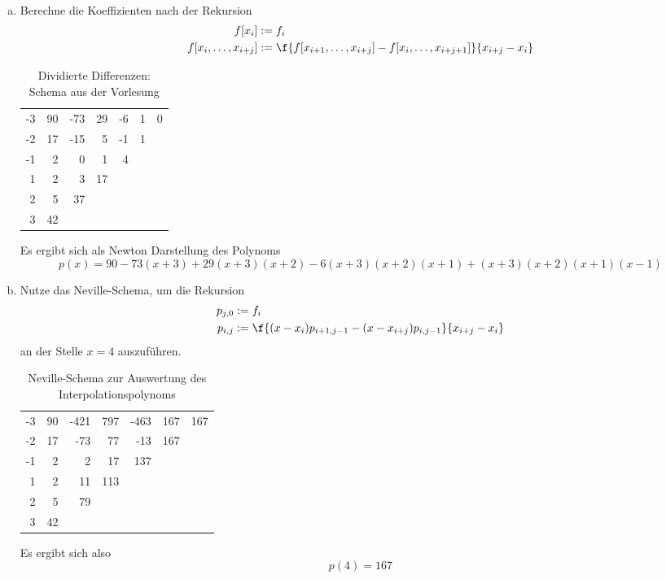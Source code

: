 \documentclass[a4paper]{scrartcl}
\begin{document}
\begin{aufgabe}~

	\begin{enumerate}[a)]
		\item 
			Berechne die Koeffizienten nach der Rekursion
			\begin{align*}
				f[x_i] &:= f_i\\
				f[x_i,\dotsc,x_{i+j}] &:= \f {f[x_{i+1},\dotsc,x_{i+j}]-f[x_i,\dotsc,x_{i+j+1}]}{x_{i+j}-x_i}
			\end{align*}

			\begin{table}[h]
				\centering
				\caption{Dividierte Differenzen: Schema aus der Vorlesung}
				\begin{tabular}{r|rrrrrr}
					-3 & 90 & -73 & 29 & -6 & 1 & 0 \\
					-2 & 17 & -15 & 5 & -1 & 1 & \\
					-1 & 2 & 0 & 1 & 4 & & \\
					 1 & 2 & 3 & 17 & & & \\
					 2 & 5 & 37 & & & & \\
					 3 & 42 & & & & &
				\end{tabular}
			\end{table}
			Es ergibt sich als Newton Darstellung des Polynoms
			\[
				p(x) = 90 - 73(x+3) + 29(x+3)(x+2) - 6(x+3)(x+2)(x+1) + (x+3)(x+2)(x+1)(x-1)
			\]
		\item
			Nutze das Neville-Schema, um die Rekursion
			\begin{align*}
				p_{j,0} &:= f_i \\
				p_{i,j} &:= \f {(x-x_i)p_{i+1,j-1}-(x-x_{i+j})p_{i,j-1}}{x_{i+j}-x_i}
			\end{align*}
			an der Stelle $x=4$ auszuführen.

			\begin{table}[h]
				\centering
				\caption{Neville-Schema zur Auswertung des Interpolationspolynoms}
				\begin{tabular}{r|rrrrrr}
					-3 & 90 & -421 & 797 & -463 & 167 & 167 \\
					-2 & 17 & -73 & 77 & -13 & 167 & \\
					-1 & 2 & 2 & 17 & 137 & & \\
					 1 & 2 & 11 & 113 & & & \\
					 2 & 5 & 79 & & & & \\
					 3 & 42 & & & & &
				\end{tabular}
			\end{table}
			Es ergibt sich also
			\[
				p(4) = 167
			\]
	\end{enumerate}
\end{aufgabe}
\newpage
\end{document}
